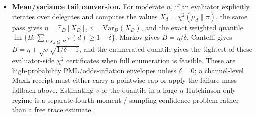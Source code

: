 \documentclass[11pt]{article}
\newcommand{\E}{\mathbb{E}}
\begin{document}
\begin{itemize}[leftmargin=1.2em]
\item \textbf{Mean/variance tail conversion.} For moderate $n$, if an evaluator
explicitly iterates over delegates and computes the values
$X_d=\chi^2(\mu_d\|\pi)$, the same pass gives
$\eta=\E_D[X_D]$, $v=\mathrm{Var}_D(X_D)$, and the exact weighted quantile
$\inf\{B:\sum_{d:X_d\le B}\pi(d)\ge 1-\delta\}$.  Markov gives
$B=\eta/\delta$, Cantelli gives
$B=\eta+\sqrt{v}\sqrt{1/\delta-1}$, and the enumerated quantile gives the
tightest of these evaluator-side $\chi^2$ certificates when full enumeration is
feasible.  These are high-probability PML/odds-inflation envelopes unless
$\delta=0$; a channel-level MaxL receipt must either carry a pointwise cap or
apply the failure-mass fallback above.  Estimating $v$ or the quantile in a
huge-$n$ Hutchinson-only regime is a separate fourth-moment /
sampling-confidence problem rather than a free trace estimate.
\end{itemize}
\end{document}

